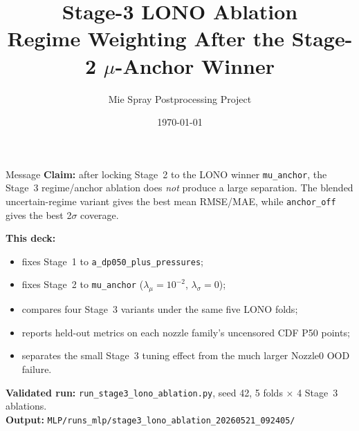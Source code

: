 \documentclass[UTF8,aspectratio=169]{ctexbeamer}
\title[Stage-3 LONO Ablation]{Stage-3 LONO Ablation\\Regime Weighting After the Stage-2 \(\mu\)-Anchor Winner}
\author{Mie Spray Postprocessing Project}
\date{\today}
\begin{document}
\begin{frame}
  \titlepage
\end{frame}

\begin{frame}{Message}
\small
\textbf{Claim:} after locking Stage~2 to the LONO winner \texttt{mu\_anchor},
the Stage~3 regime/anchor ablation does \emph{not} produce a large separation.
The blended uncertain-regime variant gives the best mean RMSE/MAE, while
\texttt{anchor\_off} gives the best 2\(\sigma\) coverage.

\vspace{0.6em}
\textbf{This deck:}
\begin{itemize}\setlength\itemsep{3pt}
  \item fixes Stage~1 to \texttt{a\_dp050\_plus\_pressures};
  \item fixes Stage~2 to \texttt{mu\_anchor} (\(\lambda_\mu=10^{-2}\), \(\lambda_\sigma=0\));
  \item compares four Stage~3 variants under the same five LONO folds;
  \item reports held-out metrics on each nozzle family's uncensored CDF P50 points;
  \item separates the small Stage~3 tuning effect from the much larger Nozzle0 OOD failure.
\end{itemize}

\vspace{0.6em}
\textbf{Validated run:} \texttt{run\_stage3\_lono\_ablation.py}, seed 42,
5 folds \(\times\) 4 Stage~3 ablations.\\
\textbf{Output:} \texttt{MLP/runs\_mlp/stage3\_lono\_ablation\_20260521\_092405/}
\end{frame}
\end{document}
